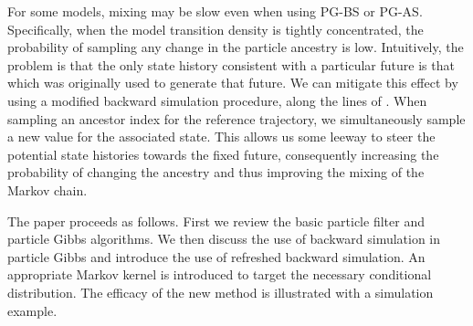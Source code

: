 \documentclass{article}
\newtheorem{theorem}{Theorem}[section]
\newcommand{\pr}{\theta}
\newcommand{\prspace}{\Theta}
\newcommand{\ls}[1]{x_{#1}}
\newcommand{\lsspace}{\mathcal{X}}
\newcommand{\ed}{\pi}
\newcommand{\pss}[1]{^{(#1)}}
\begin{document}
For some models, mixing may be slow even when using PG-BS or PG-AS. Specifically, when the model transition density is tightly concentrated, the probability of sampling any change in the particle ancestry is low. Intuitively, the problem is that the only state history consistent with a particular future is that which was originally used to generate that future. We can mitigate this effect by using a modified backward simulation procedure, along the lines of \citep{Bunch2013}. When sampling an ancestor index for the reference trajectory, we simultaneously sample a new value for the associated state. This allows us some leeway to steer the potential state histories towards the fixed future, consequently increasing the probability of changing the ancestry and thus improving the mixing of the Markov chain.

The paper proceeds as follows. First we review the basic particle filter and particle Gibbs algorithms. We then discuss the use of backward simulation in particle Gibbs and introduce the use of refreshed backward simulation. An appropriate Markov kernel is introduced to target the necessary conditional distribution. The efficacy of the new method is illustrated with a simulation example.



% 
% 
% 
% 
% 
\end{document}
